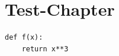 \documentclass[a4paper,11pt,bibliography=totoc,listof=totoc,headinclude=true,cleardoublepage=empty,oneside]{NumPDEsThesis}
\begin{document}


\tableofcontents

\cleardoublepage
{} 



\chapter{Test-Chapter}
\begin{verbatim}
def f(x):
    return x**3
\end{verbatim}
%
%



    


\printbibliography
\end{document}
